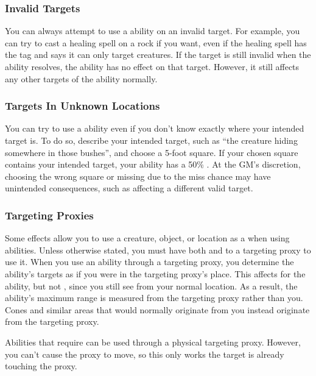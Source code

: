     \subsubsection{Invalid Targets}
      You can always attempt to use a  ability on an invalid target.
      For example, you can try to cast a healing spell on a rock if you want, even if the healing spell has the \atLife tag and says it can only target creatures.
      If the target is still invalid when the ability resolves, the ability has no effect on that target.
      However, it still affects any other targets of the ability normally.

    \subsubsection{Targets In Unknown Locations}
      You can try to use a  ability even if you don't know exactly where your intended target is.
      To do so, describe your intended target, such as ``the creature hiding somewhere in those bushes'', and choose a 5-foot square.
      If your chosen square contains your intended target, your ability has a 50\% .
      At the GM's discretion, choosing the wrong square or missing due to the miss chance may have unintended consequences, such as affecting a different valid target.

    \subsubsection{Targeting Proxies}\label{Targeting Proxies}
      Some effects allow you to use a creature, object, or location as a  when using abilities.
      Unless otherwise stated, you must have both  and  to a targeting proxy to use it.
      When you use an ability through a targeting proxy, you determine the ability's targets as if you were in the targeting proxy's place.
      This affects  for the ability, but not , since you still see from your normal location.
      As a result, the ability's maximum range is measured from the targeting proxy rather than you.
      Cones and similar areas that would normally originate from you instead originate from the targeting proxy.

      Abilities that require  can be used through a physical targeting proxy.
      However, you can't cause the proxy to move, so this only works the target is already touching the proxy.

